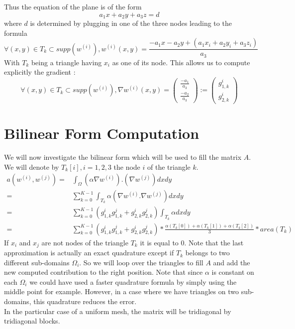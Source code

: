 \documentclass[a4paper]{report}
\begin{document}
Thus the equation of the plane is of the form
\[
a_1x+a_2y+a_3z=d
\] where $d$ is determined by plugging in one of the three nodes leading to the formula
\[
\forall (x,y) \in T_k \subset supp(w^{(i)}),w^{(i)}(x,y)=\frac{- a_1x-a_2y+ (a_1x_i+a_2y_i+a_3z_i)  }{a_3}
\]
With $T_k$ being a triangle having $x_i$ as one of its node.
This allows us to compute explicitly the gradient :
\[
\forall (x,y) \in T_k \subset supp(w^{(i)}),\nabla w^{(i)}(x,y)=\left(
\begin{matrix}
\frac{-a_1}{a_3}\\
\frac{-a_2}{a_3}
\end{matrix}
\right)
:=
\left(
\begin{matrix}
g^i_{1,k}\\
g^i_{2,k}
\end{matrix}
\right)
\]
\section{Bilinear Form Computation}
We will now investigate the bilinear form which will be used to fill the matrix $A$. We will denote by $T_k[i],i=1,2,3$ the node $i$ of the triangle $k$. 
\begin{align*}
a(w^{(i)},w^{(j)})=&\int_\Omega (\alpha \nabla w^{(i)}).(\nabla w^{(j)})dxdy\\
=&\sum_{k=0}^{K-1}\int_{T_k} \alpha(\nabla w^{(i)}.\nabla w^{(j)})dxdy\\
=&\sum_{k=0}^{K-1} (g_{1,k}^ig_{1,k}^j+g_{2,k}^ig_{2,k}^j) \int_{T_k} \alpha dxdy\\
=&\sum_{k=0}^{K-1} (g_{1,k}^ig_{1,k}^j+g_{2,k}^ig_{2,k}^j)*\frac{\alpha(T_k[0])+\alpha(T_k[1])+\alpha (T_k[2])}{3}*area(T_k)
\end{align*}
If $x_i$ and $x_j$ are not nodes of the triangle $T_k$ it is equal to $0$. Note that the last approximation is actually an exact quadrature except if $T_k$ belongs to two different sub-domains $\Omega_i$. 
So we will loop over the triangles to fill $A$ and add the new computed contribution to the right position. Note that since $\alpha$ is constant on each $\Omega_i$ we could have used a faster quadrature formula by simply using the middle point for example. However, in a case where we have triangles on two sub-domains, this quadrature reduces the error.\\
In the particular case of a uniform mesh, the matrix will be tridiagonal by tridiagonal blocks.
\end{document}
